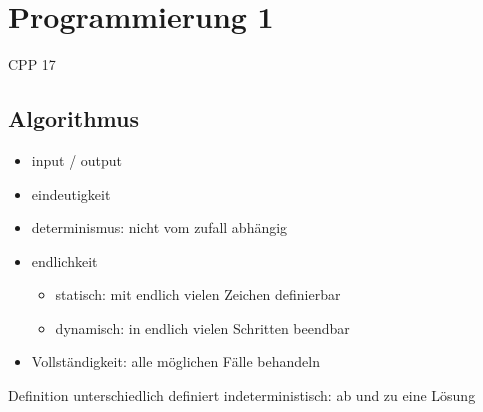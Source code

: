 \documentclass[12pt]{article}
\begin{document}
    \section*{Programmierung 1}
    CPP 17
    \subsection{Algorithmus}

    \begin{itemize}
        \item input / output
        \item eindeutigkeit
        \item determinismus: nicht vom zufall abhängig
        \item endlichkeit
        \begin{itemize}
            \item statisch: mit endlich vielen Zeichen definierbar
            \item dynamisch: in endlich vielen Schritten beendbar
        \end{itemize}
        \item Vollständigkeit: alle möglichen Fälle behandeln 
    \end{itemize}
    
    Definition
        unterschiedlich definiert
        indeterministisch: ab und zu eine Lösung
\end{document}
